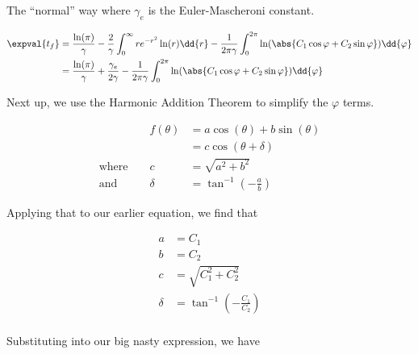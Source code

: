\begin{answer}
\begin{answerpart}{The ``normal'' way}
    where $\gamma_e$ is the Euler-Mascheroni constant.

    \begin{equation}
      \begin{split}
        \expval{t_f}
        &=
        \frac{\ln(\pi)}{\gamma}
        - 
        \frac{2}{\gamma}
        \int_{0}^{\infty}
        re^{-r^2}
        \ln(r)
        \dd{r}
        -
        \frac{1}{2\pi\gamma}
        \int_{0}^{2\pi}
        \ln(\abs{C_1\cos{\varphi} + C_2\sin{\varphi}})
        \dd{\varphi}
        \\
        &=
        \frac{\ln(\pi)}{\gamma}
        +
        \frac{\gamma_e}{2\gamma}
        -
        \frac{1}{2\pi\gamma}
        \int_{0}^{2\pi}
        \ln(\abs{C_1\cos{\varphi} + C_2\sin{\varphi}})
        \dd{\varphi}
        \\
      \end{split}
    \end{equation}

    Next up, we use the Harmonic Addition
    Theorem to simplify the $\varphi$ terms.

    \begin{equation}
      \begin{alignedat}{2}
        && f(\theta) &= a\cos(\theta) + b\sin(\theta)\\
        &&&= c\cos(\theta + \delta)\\
        \text{where } && c &= \sqrt{a^2 + b^2}\\
        \text{and } && \delta &= \tan^{-1}(-\frac{a}{b})
      \end{alignedat}
    \end{equation}

    Applying that to our earlier equation, we find that

    \begin{equation}
      \begin{split}
        a &= C_1\\
        b &= C_2\\
        c &= \sqrt{C_1^2 + C_2^2}\\
        \delta &= \tan^{-1}(-\frac{C_1}{C_2})\\
      \end{split}
    \end{equation}

    Substituting into our big nasty expression, we have


\end{answerpart}
\end{answer}
